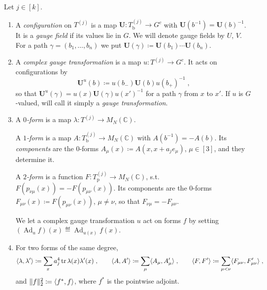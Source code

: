 \documentclass[11pt]{preprint}
\newcommand{\Ad}{\operatorname{Ad}}
\DeclarePairedDelimiter{\norm}{\lVert}{\rVert}
\numberwithin{equation}{section}
\begin{document}
\begin{definition}\label{def:configurations}
Let $j \in [k]$.
\begin{enumerate}[label=(\roman*)]
\item A \emph{configuration} on $T^{(j)}$ is a map $\mathbf U \colon T^{(j)}_{\mathrm b} \to G^c$ with $\mathbf U(b^{-1}) = \mathbf U(b)^{-1}$. It is a \emph{gauge field} if its values lie in $G$. We will denote gauge fields by $U$, $V$. For a path $\gamma = (b_1, \dots, b_n)$ we put $\mathbf U(\gamma) \coloneqq \mathbf U(b_1)\cdots\mathbf U(b_n)$.
\item A \emph{complex gauge transformation} is a map $u \colon T^{(j)} \to G^c$. It acts on configurations by
\begin{equation}\label{eq:gauge-transformation}
    \mathbf U^u(b) \coloneqq u(b_-)\mathbf U(b)u(b_+)^{-1}\;,
\end{equation}
so that $\mathbf U^u(\gamma) = u(x)\mathbf U(\gamma)u(x')^{-1}$ for a path $\gamma$ from $x$ to $x'$. If $u$ is $G$-valued, will call it simply a \emph{gauge transformation}.
\item A \emph{$0$-form} is a map $\lambda \colon T^{(j)} \to M_N(\mathbb C)$. 

A \emph{$1$-form} is a map $A \colon T^{(j)}_{\mathrm b} \to M_N(\mathbb C)$ with $A(b^{-1}) = -A(b)$. Its \emph{components} are the $0$-forms $A_\mu(x) \coloneqq A(x, x + a_j e_\mu)$, $\mu \in [3]$, and they determine it. 

A \emph{$2$-form} is a function $F \colon T^{(j)}_{\mathrm{p}} \to M_N(\mathbb C)$, s.t.\ $F(p_{\nu\mu}(x)) = -F(p_{\mu\nu}(x))$. Its components are the $0$-forms $F_{\mu\nu}(x) \coloneqq F(p_{\mu\nu}(x))$, $\mu \neq \nu$, so that $F_{\nu\mu} = -F_{\mu\nu}$. 

We let a complex gauge transformation $u$ act on forms $f$ by setting $(\Ad_u f)(x) \eqdef \Ad_{u(x)}f(x)$.
\item For two forms of the same degree,
\begin{equation}\label{eq:pairing}
    \langle\lambda, \lambda'\rangle \coloneqq \sum_xa_j^4\operatorname{tr}\lambda(x)\lambda'(x)\;,
    \qquad
    \langle A, A'\rangle \coloneqq \sum_\mu\langle A_\mu, A'_\mu\rangle\;,
    \qquad
    \langle F, F'\rangle \coloneqq \sum_{\mu < \nu}\langle F_{\mu\nu}, F'_{\mu\nu}\rangle\;,
\end{equation}
and $\norm f_2^2 \coloneqq \langle f^*, f\rangle$, where $f^*$ is the pointwise adjoint.
\end{enumerate}
\end{definition}
\end{document}
